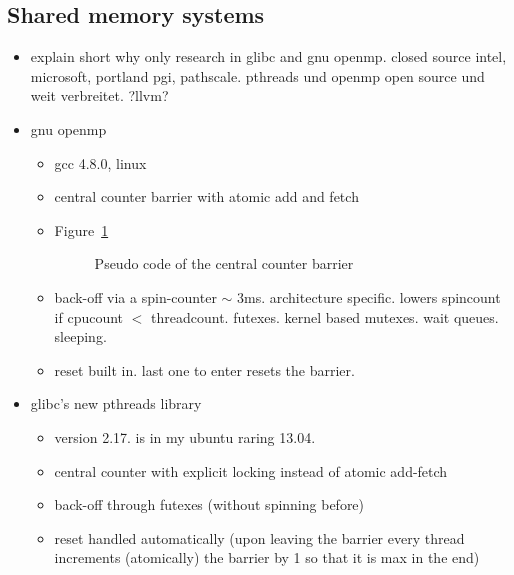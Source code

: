 \documentclass[a4paper, 10pt]{article}
\begin{document}
\subsection{Shared memory systems}
\begin{itemize}
	\item explain short why only research in glibc and gnu openmp\cite{openmp}. closed source intel, microsoft, portland pgi, pathscale. pthreads und openmp open source und weit verbreitet. ?llvm?
	\item gnu openmp\cite{gomp}
		\begin{itemize}
			\item gcc 4.8.0, linux
			\item central counter barrier with atomic add and fetch
			\item Figure~\ref{fig:central-counter-no-reset}
				\begin{figure}[htbp]
					\centering
					
					\caption{Pseudo code of the central counter barrier}
					\label{fig:central-counter-no-reset}
				\end{figure}

			\item back-off via a spin-counter $\sim$ 3ms. architecture specific. lowers spincount if cpucount $<$ threadcount. futexes\cite{franke2002}. kernel based mutexes. wait queues. sleeping.
			\item reset built in. last one to enter resets the barrier.
		\end{itemize}
	\item glibc's\cite{glibc} new pthreads library
		\begin{itemize}
			\item version 2.17. is in my ubuntu raring 13.04.
			\item central counter with explicit locking instead of atomic add-fetch
			\item back-off through futexes (without spinning before)
			\item reset handled automatically (upon leaving the barrier every thread increments (atomically) the barrier by 1 so that it is max in the end)
		\end{itemize}
\end{itemize}
\end{document}
